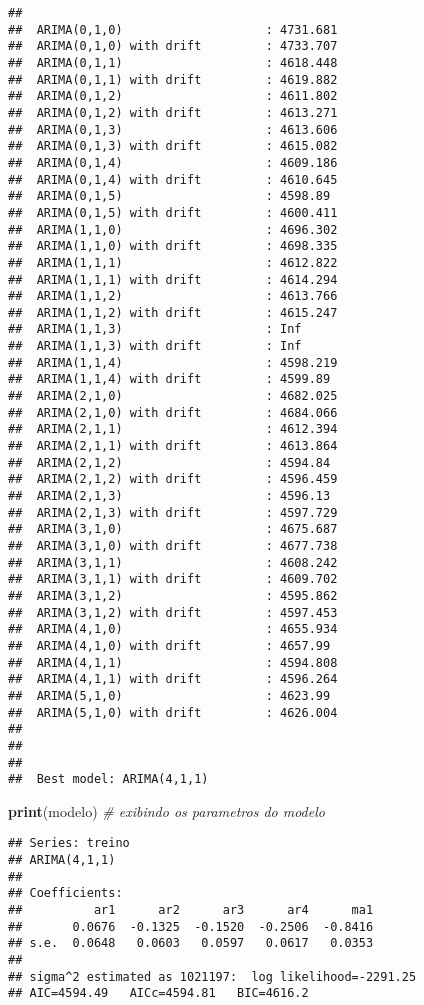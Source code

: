 \documentclass[
]{article}
\newenvironment{Shaded}{\begin{snugshade}}{\end{snugshade}}
\newcommand{\CommentTok}[1]{\textcolor[rgb]{0.56,0.35,0.01}{\textit{#1}}}
\newcommand{\KeywordTok}[1]{\textcolor[rgb]{0.13,0.29,0.53}{\textbf{#1}}}
\newcommand{\NormalTok}[1]{#1}
\begin{document}
\begin{verbatim}
## 
##  ARIMA(0,1,0)                    : 4731.681
##  ARIMA(0,1,0) with drift         : 4733.707
##  ARIMA(0,1,1)                    : 4618.448
##  ARIMA(0,1,1) with drift         : 4619.882
##  ARIMA(0,1,2)                    : 4611.802
##  ARIMA(0,1,2) with drift         : 4613.271
##  ARIMA(0,1,3)                    : 4613.606
##  ARIMA(0,1,3) with drift         : 4615.082
##  ARIMA(0,1,4)                    : 4609.186
##  ARIMA(0,1,4) with drift         : 4610.645
##  ARIMA(0,1,5)                    : 4598.89
##  ARIMA(0,1,5) with drift         : 4600.411
##  ARIMA(1,1,0)                    : 4696.302
##  ARIMA(1,1,0) with drift         : 4698.335
##  ARIMA(1,1,1)                    : 4612.822
##  ARIMA(1,1,1) with drift         : 4614.294
##  ARIMA(1,1,2)                    : 4613.766
##  ARIMA(1,1,2) with drift         : 4615.247
##  ARIMA(1,1,3)                    : Inf
##  ARIMA(1,1,3) with drift         : Inf
##  ARIMA(1,1,4)                    : 4598.219
##  ARIMA(1,1,4) with drift         : 4599.89
##  ARIMA(2,1,0)                    : 4682.025
##  ARIMA(2,1,0) with drift         : 4684.066
##  ARIMA(2,1,1)                    : 4612.394
##  ARIMA(2,1,1) with drift         : 4613.864
##  ARIMA(2,1,2)                    : 4594.84
##  ARIMA(2,1,2) with drift         : 4596.459
##  ARIMA(2,1,3)                    : 4596.13
##  ARIMA(2,1,3) with drift         : 4597.729
##  ARIMA(3,1,0)                    : 4675.687
##  ARIMA(3,1,0) with drift         : 4677.738
##  ARIMA(3,1,1)                    : 4608.242
##  ARIMA(3,1,1) with drift         : 4609.702
##  ARIMA(3,1,2)                    : 4595.862
##  ARIMA(3,1,2) with drift         : 4597.453
##  ARIMA(4,1,0)                    : 4655.934
##  ARIMA(4,1,0) with drift         : 4657.99
##  ARIMA(4,1,1)                    : 4594.808
##  ARIMA(4,1,1) with drift         : 4596.264
##  ARIMA(5,1,0)                    : 4623.99
##  ARIMA(5,1,0) with drift         : 4626.004
## 
## 
## 
##  Best model: ARIMA(4,1,1)
\end{verbatim}

\begin{Shaded}
\begin{Highlighting}[]
\KeywordTok{print}\NormalTok{(modelo) }\CommentTok{# exibindo os parametros do modelo}
\end{Highlighting}
\end{Shaded}

\begin{verbatim}
## Series: treino 
## ARIMA(4,1,1) 
## 
## Coefficients:
##          ar1      ar2      ar3      ar4      ma1
##       0.0676  -0.1325  -0.1520  -0.2506  -0.8416
## s.e.  0.0648   0.0603   0.0597   0.0617   0.0353
## 
## sigma^2 estimated as 1021197:  log likelihood=-2291.25
## AIC=4594.49   AICc=4594.81   BIC=4616.2
\end{verbatim}
\end{document}
